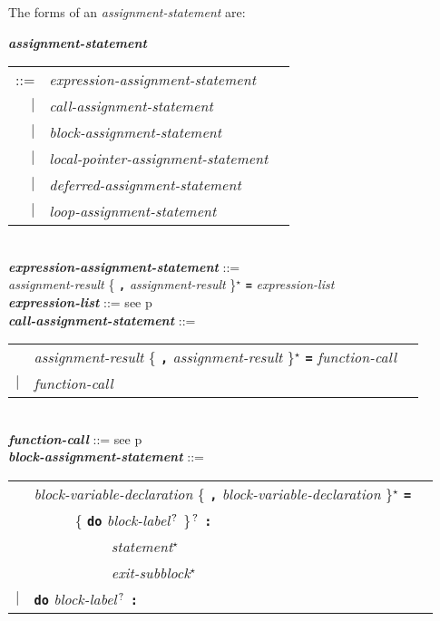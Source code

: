 \documentclass[12pt]{article}
\newcommand{\TT}[1]{{\tt \bfseries #1}}
\newcommand{\STAR}{{\Large $^\star$}}
\newcommand{\QMARK}{{$^{\,\mbox{\footnotesize ?}}$}}
\newcommand{\ttkey}[1]{{\tt \bfseries #1}}
\newcommand{\emkey}[1]{{\em \bfseries #1}}
\newcommand{\pagref}[1]{p\pageref{#1}}
\newenvironment{indpar}[1][0.3in]%
	{\begin{list}{}%
		     {\setlength{\itemsep}{0in}%
		      \setlength{\topsep}{0in}%
		      \setlength{\parsep}{1ex}%
		      \setlength{\labelwidth}{#1}%
		      \setlength{\leftmargin}{#1}%
		      \addtolength{\leftmargin}{\labelsep}}%
	 \item}%
	{\end{list}}
\begin{document}
The forms of an {\em assignment-statement} are:
\begin{indpar}
\emkey{assignment-statement}
    \begin{tabular}[t]{@{}rll}
    ::= & {\em expression-assignment-statement} \\
    $|$ & {\em call-assignment-statement} \\
    $|$ & {\em block-assignment-statement} \\
    $|$ & {\em local-pointer-assignment-statement} \\
    $|$ & {\em deferred-assignment-statement} \\
    $|$ & {\em loop-assignment-statement} \\
    \end{tabular}
\\[0.5ex]
\emkey{expression-assignment-statement} ::= \\
\hspace*{0.5in} {\em assignment-result}
                \{ \TT{,} {\em assignment-result} \}\STAR{}
		\TT{=} {\em expression-list}
\\[0.5ex]
\emkey{expression-list} ::= see \pagref{EXPRESSION-LIST}
\\[0.5ex]
\emkey{call-assignment-statement} ::= \\
\hspace*{0.5in}
    \begin{tabular}[t]{@{}rll}
        & {\em assignment-result}
                \{ \TT{,} {\em assignment-result} \}\STAR{}
		\TT{=} {\em function-call} \\
    $|$ & {\em function-call} \\
    \end{tabular}
\\[0.5ex]
\emkey{function-call} ::= see \pagref{FUNCTION-CALLS}
\\[0.5ex]
\emkey{block-assignment-statement} ::= \\
\hspace*{0.5in}
    \begin{tabular}[t]{@{}rll}
        & {\em block-variable-declaration}
                \{ \TT{,} {\em block-variable-declaration} \}\STAR{}
		\TT{=} \\
	& ~~~~~ \{ \ttkey{do} {\em block-label}\QMARK{} \}\QMARK{}
		   \TT{:} \\
        & ~~~~~~~~~~ {\em statement}\STAR{} \\
        & ~~~~~~~~~~ {\em exit-subblock}\STAR{} \\
    $|$ & \ttkey{do} {\em block-label}\QMARK{} \TT{:} \\

\end{tabular}
\end{indpar}
\end{document}
